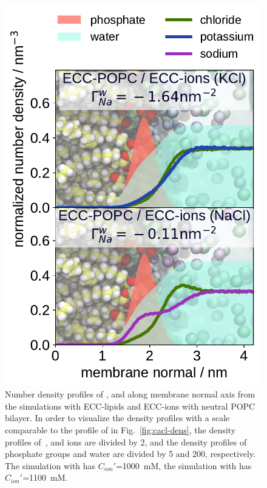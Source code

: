 \begin{figure}[tbp!] 
  \centering 
  \includegraphics[width=\figwidth]{../img/ecc_popc/density_profiles_ca_cl_wat_phos_models-compar_5-7_NaCl-KCl.pdf}
  \caption{\label{fig:nacl-dens} 
    Number density profiles of ,  and  along membrane normal axis 
    from the simulations with ECC-lipids and ECC-ions with neutral POPC bilayer.  
    In order to visualize the density profiles with a scale comparable to the profile of  in Fig.~\ref{fig:cacl-dens},  
    the density profiles of~,  and  ions are divided by 2, and 
    the density profiles of phosphate groups and water are divided by 5 and 200, respectively.  
    The simulation with  has $C_{ion}'$=1000~mM, 
    the simulation with   has $C_{ion}'$=1100~mM. 
    } 
\end{figure} 


